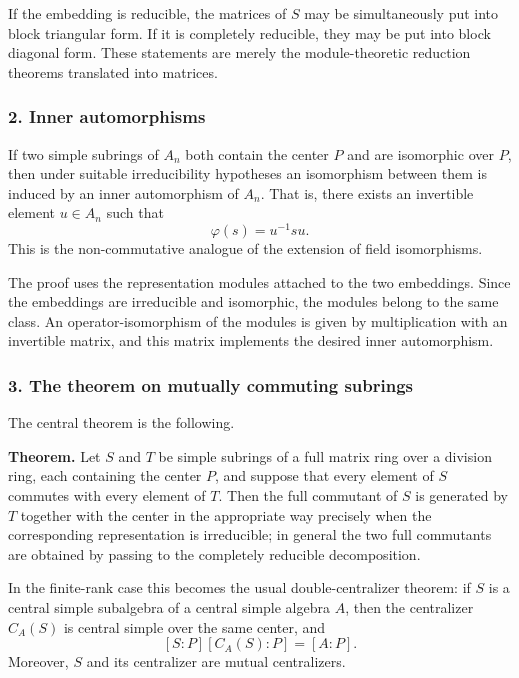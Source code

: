 \documentclass[
  11pt,
]{article}
\begin{document}
If the embedding is reducible, the matrices of \(S\) may be
simultaneously put into block triangular form. If it is completely
reducible, they may be put into block diagonal form. These statements
are merely the module-theoretic reduction theorems translated into
matrices.

\subsubsection{2. Inner automorphisms}\label{inner-automorphisms}

If two simple subrings of \(A_n\) both contain the center \(P\) and are
isomorphic over \(P\), then under suitable irreducibility hypotheses an
isomorphism between them is induced by an inner automorphism of \(A_n\).
That is, there exists an invertible element \(u\in A_n\) such that \[
  \varphi(s)=u^{-1}su.
\] This is the non-commutative analogue of the extension of field
isomorphisms.

The proof uses the representation modules attached to the two
embeddings. Since the embeddings are irreducible and isomorphic, the
modules belong to the same class. An operator-isomorphism of the modules
is given by multiplication with an invertible matrix, and this matrix
implements the desired inner automorphism.

\subsubsection{3. The theorem on mutually commuting
subrings}\label{the-theorem-on-mutually-commuting-subrings}

The central theorem is the following.

\textbf{Theorem.} Let \(S\) and \(T\) be simple subrings of a full
matrix ring over a division ring, each containing the center \(P\), and
suppose that every element of \(S\) commutes with every element of
\(T\). Then the full commutant of \(S\) is generated by \(T\) together
with the center in the appropriate way precisely when the corresponding
representation is irreducible; in general the two full commutants are
obtained by passing to the completely reducible decomposition.

In the finite-rank case this becomes the usual double-centralizer
theorem: if \(S\) is a central simple subalgebra of a central simple
algebra \(A\), then the centralizer \(C_A(S)\) is central simple over
the same center, and \[
  [S:P]
  [C_A(S):P]
  =[A:P].
\] Moreover, \(S\) and its centralizer are mutual centralizers.
\end{document}

